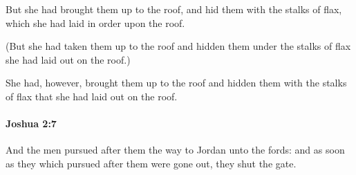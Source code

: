 			\begin{versebox}
					\item[BHS] 
					\item[ASV] But she had brought them up to the roof, and hid them with the stalks of flax, which she had laid in order upon the roof.
					\item[NIV] (But she had taken them up to the roof and hidden them under the stalks of flax she had laid out on the roof.)
					\item[NRSV] She had, however, brought them up to the roof and hidden them with the stalks of flax that she had laid out on the roof.
			\end{versebox}

		\paragraph{Joshua 2:7} %
			\label{JOSHUA-2-7}

			And the men pursued after them the way to Jordan unto the fords: and as soon as they which pursued after them were gone out, they shut the gate.

